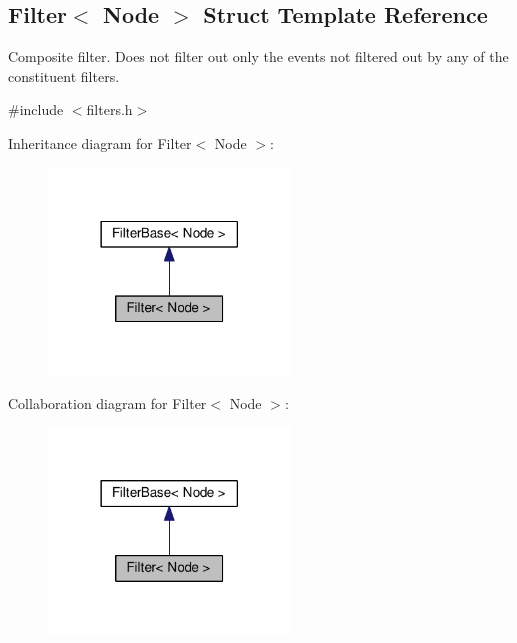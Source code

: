 \hypertarget{structFilter}{}\subsection{Filter$<$ Node $>$ Struct Template Reference}
\label{structFilter}


Composite filter. Does not filter out only the events not filtered out by any of the constituent filters.  




{\ttfamily \#include $<$filters.\+h$>$}



Inheritance diagram for Filter$<$ Node $>$\+:\nopagebreak
\begin{figure}[H]
\begin{center}
\leavevmode
\includegraphics[width=182pt]{structFilter__inherit__graph}
\end{center}
\end{figure}


Collaboration diagram for Filter$<$ Node $>$\+:\nopagebreak
\begin{figure}[H]
\begin{center}
\leavevmode
\includegraphics[width=182pt]{structFilter__coll__graph}
\end{center}
\end{figure}
